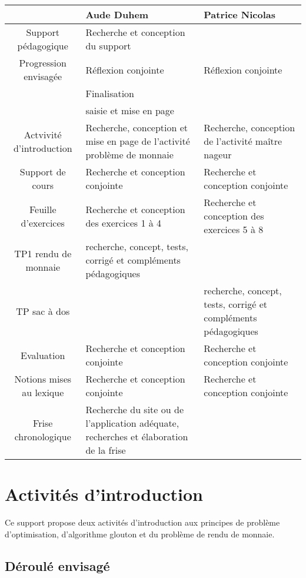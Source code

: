 \documentclass[12pt,french]{report}
\begin{document}
\begin{tabular}{|c|m{7cm}|m{7cm}|}
\hline
&Aude Duhem&Patrice Nicolas\\
\hline
Support pédagogique&Recherche et conception du support&\\
\hline
Progression envisagée&Réflexion conjointe&Réflexion conjointe\\
&Finalisation&\\
&saisie et mise en page&\\
\hline
Actvivité d'introduction&Recherche, conception et mise en page de l'activité problème de monnaie &Recherche, conception de l'activité maître nageur\\
\hline
Support de cours&Recherche et conception conjointe&Recherche et conception conjointe\\
\hline
Feuille d'exercices&Recherche et conception des exercices 1 à 4&Recherche et conception des exercices 5 à 8\\
\hline
TP1 rendu de monnaie&recherche, concept, tests, corrigé et compléments pédagogiques&\\
\hline
TP sac à dos&&recherche, concept, tests, corrigé et compléments pédagogiques\\
\hline
Evaluation&Recherche et conception conjointe&Recherche et conception conjointe\\
\hline
Notions mises au lexique&Recherche et conception conjointe&Recherche et conception conjointe\\
\hline

Frise chronologique&Recherche du site ou de l'application adéquate, 
recherches et élaboration de la frise&\\
\hline
\end{tabular}
\appendix

\chapter{Activités d'introduction}
Ce support propose deux activités d'introduction aux principes de problème d'optimisation, d'algorithme glouton et du problème de rendu de monnaie. \\

\section{\textbf{Déroulé envisagé }}
\end{document}
